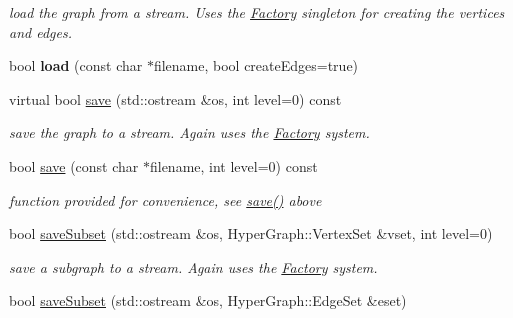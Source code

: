 \begin{DoxyCompactItemize}
\begin{DoxyCompactList}\small\item\em load the graph from a stream. Uses the \hyperlink{classg2o_1_1Factory}{Factory} singleton for creating the vertices and edges. \end{DoxyCompactList}\item 
\hypertarget{structg2o_1_1OptimizableGraph_a305fe91c405fc960df051d9581e524bc}{bool {\bfseries load} (const char $\ast$filename, bool create\-Edges=true)}\label{structg2o_1_1OptimizableGraph_a305fe91c405fc960df051d9581e524bc}

\item 
\hypertarget{structg2o_1_1OptimizableGraph_ac38749c4a2416dcbaf37a111996f7483}{virtual bool \hyperlink{structg2o_1_1OptimizableGraph_ac38749c4a2416dcbaf37a111996f7483}{save} (std\-::ostream \&os, int level=0) const }\label{structg2o_1_1OptimizableGraph_ac38749c4a2416dcbaf37a111996f7483}

\begin{DoxyCompactList}\small\item\em save the graph to a stream. Again uses the \hyperlink{classg2o_1_1Factory}{Factory} system. \end{DoxyCompactList}\item 
\hypertarget{structg2o_1_1OptimizableGraph_a35d607b133c3cb3a04fb82a3376bbcfc}{bool \hyperlink{structg2o_1_1OptimizableGraph_a35d607b133c3cb3a04fb82a3376bbcfc}{save} (const char $\ast$filename, int level=0) const }\label{structg2o_1_1OptimizableGraph_a35d607b133c3cb3a04fb82a3376bbcfc}

\begin{DoxyCompactList}\small\item\em function provided for convenience, see \hyperlink{structg2o_1_1OptimizableGraph_ac38749c4a2416dcbaf37a111996f7483}{save()} above \end{DoxyCompactList}\item 
\hypertarget{structg2o_1_1OptimizableGraph_adcf211f9c7bf3ee9dab65b130807402c}{bool \hyperlink{structg2o_1_1OptimizableGraph_adcf211f9c7bf3ee9dab65b130807402c}{save\-Subset} (std\-::ostream \&os, Hyper\-Graph\-::\-Vertex\-Set \&vset, int level=0)}\label{structg2o_1_1OptimizableGraph_adcf211f9c7bf3ee9dab65b130807402c}

\begin{DoxyCompactList}\small\item\em save a subgraph to a stream. Again uses the \hyperlink{classg2o_1_1Factory}{Factory} system. \end{DoxyCompactList}\item 
\hypertarget{structg2o_1_1OptimizableGraph_a2a08383ab953d435eaaca6231b64c3b6}{bool \hyperlink{structg2o_1_1OptimizableGraph_a2a08383ab953d435eaaca6231b64c3b6}{save\-Subset} (std\-::ostream \&os, Hyper\-Graph\-::\-Edge\-Set \&eset)}\label{structg2o_1_1OptimizableGraph_a2a08383ab953d435eaaca6231b64c3b6}


\end{DoxyCompactItemize}
